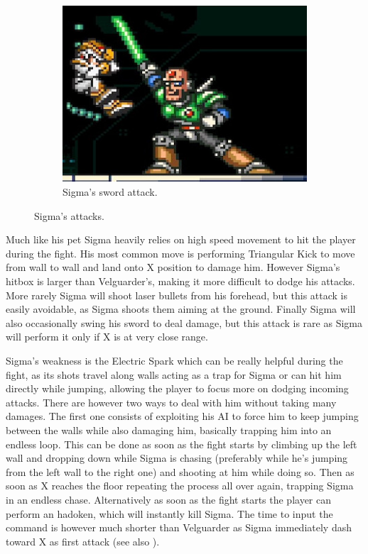 \begin{figure}[htp]
\begin{subfigure}[t]{0.4\linewidth}
		\includegraphics[width=\linewidth]{figures/X1/Sigma_stages/Sigma_sword.jpg}
		\caption{Sigma's sword attack.}
	\end{subfigure}
	\caption{Sigma's attacks.}
\end{figure}

Much like his pet Sigma heavily relies on high speed movement to hit the player during the fight. His most common move is performing Triangular Kick to move from wall to wall and land onto X position to damage him. However Sigma's hitbox is larger than Velguarder's, making it more difficult to dodge his attacks. More rarely Sigma will shoot laser bullets from his forehead, but this attack is easily avoidable, as Sigma shoots them aiming at the ground. Finally Sigma will also occasionally swing his sword to deal damage, but this attack is rare as Sigma will perform it only if X is at very close range.

Sigma's weakness is the Electric Spark which can be really helpful during the fight, as its shots travel along walls acting as a trap for Sigma or can hit him directly while jumping, allowing the player to focus more on dodging incoming attacks. There are however two ways to deal with him  without taking many damages. The first one consists of exploiting his AI to force him to keep jumping between the walls while also damaging him, basically trapping him into an endless loop. This can be done as soon as the fight starts by climbing up the left wall and dropping down while Sigma is chasing (preferably while he's jumping from the left wall to the right one) and shooting at him while doing so. Then as soon as X reaches the floor repeating the process all over again, trapping Sigma in an endless chase. Alternatively as soon as the fight starts the player can perform an hadoken, which will instantly kill Sigma. The time to input the command is however much shorter than Velguarder as Sigma immediately dash toward X as first attack (see also ).

